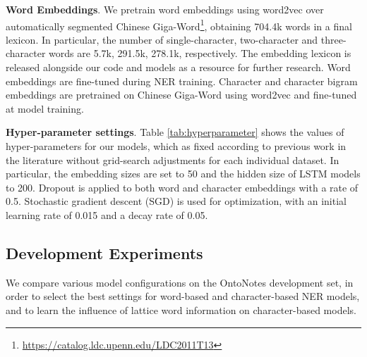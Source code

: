 \documentclass[11pt,a4paper]{article}
\begin{document}
\begin{CJK*}{UTF8}{gbsn}
\textbf{Word Embeddings}. We pretrain word embeddings using word2vec \cite{mikolov2013distributed} over automatically segmented Chinese Giga-Word\footnote{\url{https://catalog.ldc.upenn.edu/LDC2011T13}}, obtaining 704.4k words in a final lexicon. In particular, the number of single-character, two-character and three-character words are 5.7k, 291.5k, 278.1k, respectively. The embedding lexicon is released alongside our code and models as a resource for further research. Word embeddings are fine-tuned during NER training. Character and character bigram embeddings are pretrained on Chinese Giga-Word using word2vec and fine-tuned at model training. 


\textbf{Hyper-parameter settings}. Table \ref{tab:hyperparameter} shows the values of hyper-parameters for our models, which as fixed according to previous work in the literature without grid-search adjustments for each individual dataset. In particular, the embedding sizes are set to 50 and the hidden size of LSTM models to 200. Dropout \cite{srivastava2014dropout} is applied to both word and character embeddings with a rate of 0.5. Stochastic gradient descent (SGD) is used for optimization, with an initial learning rate of 0.015 and a decay rate of 0.05.


\begin{table}[!tp]
\begin{center}
\end{center}
\caption{Hyper-parameter values.}
\label{tab:hyperparameter}
\end{table}

\subsection{Development Experiments}
We compare various model configurations on the OntoNotes development set, in order to select the best settings for word-based and character-based NER models, and to learn the influence of lattice word information on character-based models.


\end{CJK*}
\end{document}
